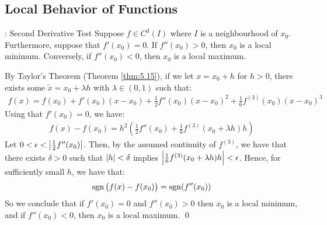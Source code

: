 \subsection{Local Behavior of Functions}
\begin{ntheorem}{: Second Derivative Test}{}
    Suppose $f \in C^{3}(I)$ where $I$ is a neighbourhood of $x_0$. Furthermore, suppose that $f'(x_0) = 0$. If $f''(x_0) > 0$, then $x_0$ is a local minimum. Conversely, if $f''(x_0) < 0$, then $x_0$ is a local maximum.
\end{ntheorem}
\begin{nproof}
    By Taylor's Theorem (Theorem \ref{thm:5.15}), if we let $x = x_0 + h$ for $h > 0$, there exists some $\tilde{x} = x_0 + \lambda h$ with $\lambda \in (0, 1)$ such that:
    \begin{align*}
        f(x) = f(x_0) + f'(x_0)(x - x_0) + \frac{1}{2}f''(x_0)(x - x_0)^2 + \frac{1}{6}f^{(3)}(x_0)(x - x_0)^3
    \end{align*}
    Using that $f'(x_0) = 0$, we have:
    \begin{align*}
        f(x) - f(x_0) = h^2\left(\frac{1}{2}f''(x_0) + \frac{1}{6}f^{(3)}(x_0 + \lambda h) h\right)
    \end{align*} 
    Let $0 < \epsilon < \abs{\frac{1}{2}f''(x_0)}$. Then, by the assumed continuity of $f^(3)$, we have that there exists $\delta > 0$ such that $\abs{h} < \delta$ implies $\abs{\frac{1}{6}f^{(3)}(x_0 + \lambda h)h} < \epsilon$. Hence, for sufficiently small $h$, we have that:
    \begin{align*}
        \operatorname{sgn}\left(f(x) - f(x_0)\right) = \operatorname{sgn}(f''(x_0))
    \end{align*}
    So we conclude that if $f'(x_0) = 0$ and $f''(x_0) > 0$ then $x_0$ is a local minimum, and if $f''(x_0) < 0$, then $x_0$ is a local maximum. \qed
\end{nproof}

